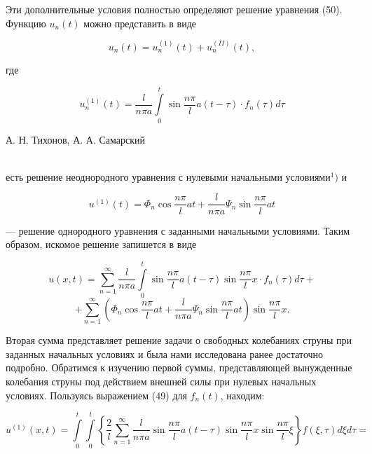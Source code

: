\documentclass{article}
\begin{document}
\noindent
Эти дополнительные условия полностью определяют решение уравнения (50). Функцию $u_n(t)$ можно представить в виде

\begin{equation*}
    u_n(t) = u_n^{(1)}(t) + u_n^{(II)}(t),
\end{equation*}

\noindent
где

\begin{equation}
    u_n^{(1)}(t) = \frac{l}{n\pi a} \int\limits_{0}^{t} \sin{\frac{n\pi}{l} a (t - \tau)} \cdot f_n(\tau) d\tau \tag{52}
\end{equation}

 А. Н. Тихонов, А. А. Самарский


\noindent
\\

\noindent
есть решение неоднородного уравнения с нулевыми начальными условиями$^1)$ и

\begin{equation}
    u^{(1)}(t) = \Phi_n \cos{\frac{n\pi}{l} at} + \frac{l}{n\pi a} \Psi_n \sin{\frac{n\pi}{l} at} \tag{53}
\end{equation}

\noindent
— решение однородного уравнения с заданными начальными условиями. Таким образом, искомое решение запишется в виде

\begin{equation*}
    u(x, t) = \sum_{n=1}^{\infty} \frac{l}{n\pi a} \int\limits_{0}^{t} \sin{\frac{n\pi}{l} a (t - \tau)} \sin{\frac{n\pi}{l} x} \cdot f_n(\tau) d\tau +
\end{equation*}
\begin{equation}
    + \sum_{n=1}^{\infty} \left( \Phi_n \cos{\frac{n\pi}{l} at} + \frac{l}{n\pi a} \Psi_n \sin{\frac{n\pi}{l} at} \right) \sin{\frac{n\pi}{l} x}. \tag{54}
\end{equation}

\noindent
Вторая сумма представляет решение задачи о свободных колебаниях струны при заданных начальных условиях и была нами исследована ранее достаточно подробно. Обратимся к изучению первой суммы, представляющей вынужденные колебания струны под действием внешней силы при нулевых начальных условиях. Пользуясь выражением (49) для $f_n(t)$, находим:

\begin{equation*}
    u^{(1)}(x, t) = \int\limits_{0}^{t}\int\limits_{0}^{t} \left\{ \frac{2}{l} \sum_{n=1}^{\infty} \frac{l}{n\pi a} \sin{\frac{n\pi}{l} a (t - \tau)} \sin{\frac{n\pi}{l} x} \sin{\frac{n\pi}{l} \xi} \right\} f(\xi, \tau) d\xi d\tau =
\end{equation*}
\end{document}
